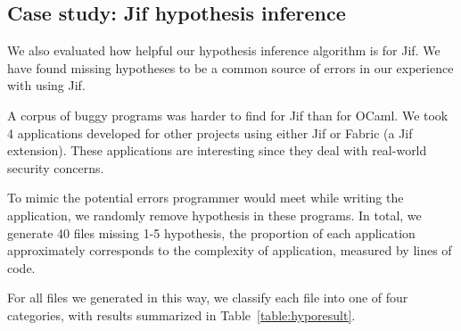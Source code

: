 \begin{table}
\end{table}

\subsection{Case study: Jif hypothesis inference}
\label{sec:jifeval}
We also evaluated how helpful our hypothesis inference algorithm is
for Jif. We have found missing hypotheses to be a common
source of errors in our experience with using Jif.

A corpus of buggy programs was harder to find for Jif than for OCaml.
We took 4 applications developed for other projects using either Jif
or Fabric (a Jif extension). These applications are interesting since
they deal with real-world security concerns.

To mimic the potential errors programmer would meet while writing the
application, we randomly remove hypothesis in these programs. In
total, we generate 40 files missing 1-5 hypothesis, the proportion of
each application approximately corresponds to the complexity of
application, measured by lines of code.

For all files we generated in this way, we classify each file into
one of four categories, with results summarized in
Table~\ref{table:hyporesult}.

